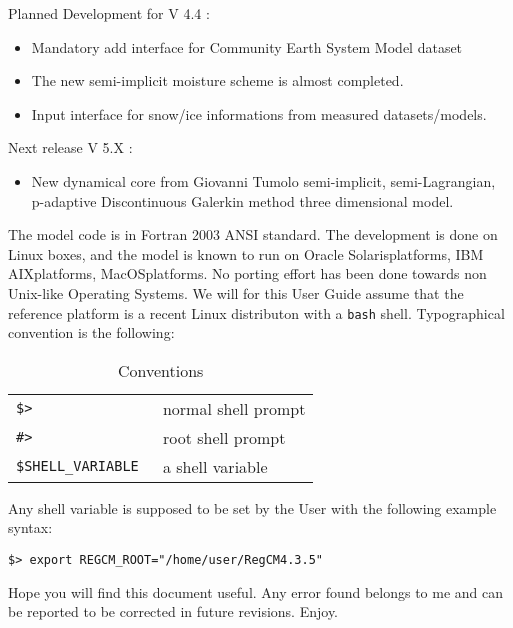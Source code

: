 Planned Development for V 4.4 :

\begin{itemize}
  \item Mandatory add interface for Community Earth System Model dataset
  \item The new semi-implicit moisture scheme is almost completed.
  \item Input interface for snow/ice informations from measured datasets/models.
\end{itemize}

Next release V 5.X :

\begin{itemize}
  \item New dynamical core from Giovanni Tumolo semi-implicit, semi-Lagrangian,
   p-adaptive Discontinuous Galerkin method three dimensional model.
\end{itemize}

The model code is in Fortran 2003 ANSI standard.
The development is done on Linux boxes, and the model is known to run
on Oracle Solaris\texttrademark platforms, IBM AIX\texttrademark platforms,
MacOS\texttrademark platforms.
No porting effort has been done towards non Unix-like Operating Systems.
We will for this User Guide assume that the reference platform is a recent
Linux distributon with a \verb=bash= shell.
Typographical convention is the following:

\begin{table}[ht]
\caption{Conventions}
\vspace{0.05 in}
\centering
\begin{tabular}{l|l}
\hline
\verb=$> = & normal shell prompt \\
\verb=#> = & root shell prompt \\
\verb=$SHELL_VARIABLE = & a shell variable \\
\hline
\end{tabular}
\label{conventions}
\end{table}

Any shell variable is supposed to be set by the User with the following example
syntax:

\begin{Verbatim}
$> export REGCM_ROOT="/home/user/RegCM4.3.5"
\end{Verbatim}

Hope you will find this document useful. Any error found belongs to me and can
be reported to be corrected in future revisions. Enjoy.

